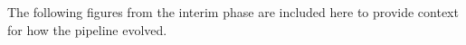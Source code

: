 \documentclass[12pt, a4paper]{article}
\begin{document}




The following figures from the interim phase are included here to provide context for how the pipeline evolved.
\end{document}
